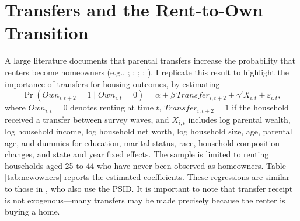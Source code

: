 \documentclass[12pt]{article}
\begin{document}
\newpage
\begingroup\singlespacing
\nocite{AHS,PSID,SHED}


\endgroup
\newpage

\appendix

\setcounter{figure}{0}
\renewcommand{\thefigure}{A\arabic{figure}}
\setcounter{table}{0}
\renewcommand{\thetable}{A\arabic{table}}

\section{Transfers and the Rent-to-Own Transition}\label{app:rent_to_own}
A large literature documents that parental transfers increase the probability that renters become homeowners (e.g., \citealp{wold2024housing}; \citealp{Blickle2019}; \citealp{benetton2022dynastic}; \citealp{Guiso2002}; \citealp{Engelhardt1998}). I replicate this result to highlight the importance of transfers for housing outcomes, by estimating
\begin{equation}	\label{eq:transferrent}
	\Pr\left(Own_{i,t+2}=1 \mid Own_{i,t}=0\right)
	= \alpha + \beta\,Transfer_{i,t+2}
	  + \gamma' X_{i,t} + \varepsilon_{i,t},
\end{equation}
where \(Own_{i,t}=0\) denotes renting at time \(t\), \(Transfer_{i,t+2}=1\) if the household received a transfer between survey waves, and \(X_{i,t}\) includes log parental wealth, log household income, log household net worth, log household size, age, parental age, and dummies for  education, marital status, race, household composition changes, and state and year fixed effects. The sample is limited to renting households aged 25 to 44 who have never been observed as homeowners. Table \ref{tab:newowners} reports the estimated coefficients. These regressions are similar to those in \cite{Lee2018}, who also use the PSID.  It is important to note that transfer receipt is not exogenous---many transfers may be made precisely because the renter is buying a home.
\end{document}
